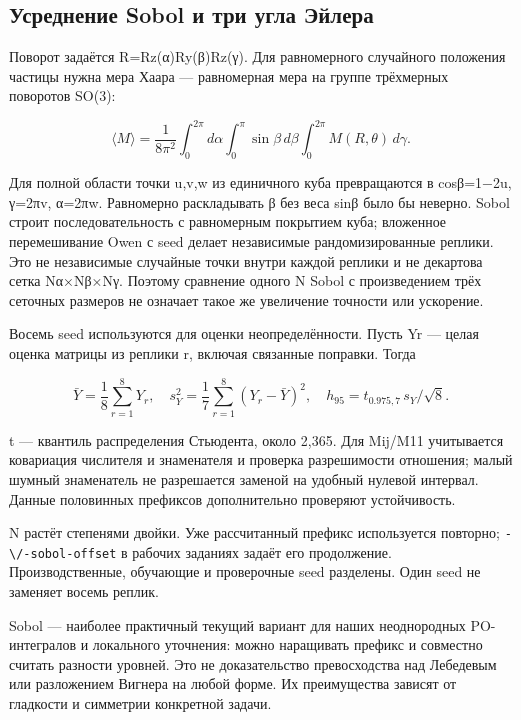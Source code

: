 \subsection{Усреднение Sobol и три угла
Эйлера}\label{ux443ux441ux440ux435ux434ux43dux435ux43dux438ux435-sobol-ux438-ux442ux440ux438-ux443ux433ux43bux430-ux44dux439ux43bux435ux440ux430}

Поворот задаётся R=Rz(α)Ry(β)Rz(γ). Для равномерного случайного
положения частицы нужна мера Хаара --- равномерная мера на группе
трёхмерных поворотов SO(3):

\[\langle M\rangle=\frac{1}{8\pi^2}
\int_0^{2\pi}\!d\alpha\int_0^\pi\!\sin\beta\,d\beta
\int_0^{2\pi}\!M(R,\theta)\,d\gamma.\]

Для полной области точки u,v,w из единичного куба превращаются в
cosβ=1−2u, γ=2πv, α=2πw. Равномерно раскладывать β без веса sinβ было бы
неверно. Sobol строит последовательность с равномерным покрытием куба;
вложенное перемешивание Owen с seed делает независимые рандомизированные
реплики. Это не независимые случайные точки внутри каждой реплики и не
декартова сетка Nα×Nβ×Nγ. Поэтому сравнение одного N Sobol с
произведением трёх сеточных размеров не означает такое же увеличение
точности или ускорение.

Восемь seed используются для оценки неопределённости. Пусть Yr --- целая
оценка матрицы из реплики r, включая связанные поправки. Тогда

\[\bar Y=\frac18\sum_{r=1}^8Y_r,\quad
s_Y^2=\frac17\sum_{r=1}^8(Y_r-\bar Y)^2,\quad
h_{95}=t_{0.975,7}\,s_Y/\sqrt8.\]

t --- квантиль распределения Стьюдента, около 2,365. Для Mij/M11
учитывается ковариация числителя и знаменателя и проверка разрешимости
отношения; малый шумный знаменатель не разрешается заменой на удобный
нулевой интервал. Данные половинных префиксов дополнительно проверяют
устойчивость.

N растёт степенями двойки. Уже рассчитанный префикс используется
повторно; \nolinkurl{-\/-sobol-offset} в рабочих заданиях задаёт его
продолжение. Производственные, обучающие и проверочные seed разделены.
Один seed не заменяет восемь реплик.

Sobol --- наиболее практичный текущий вариант для наших неоднородных
PO-интегралов и локального уточнения: можно наращивать префикс и
совместно считать разности уровней. Это не доказательство превосходства
над Лебедевым или разложением Вигнера на любой форме. Их преимущества
зависят от гладкости и симметрии конкретной задачи.

